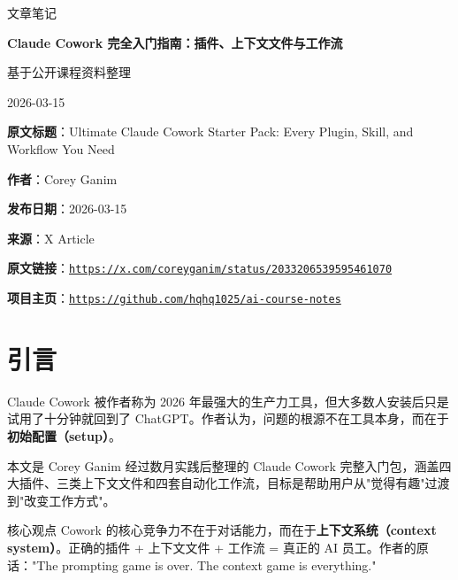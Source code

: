 \documentclass[a4paper]{article}
\newcommand{\notetitle}{Claude Cowork 完全入门指南：插件、上下文文件与工作流}
\newcommand{\noteauthors}{基于公开课程资料整理}
\newcommand{\notedate}{2026-03-15}
\newcommand{\articleauthor}{Corey Ganim}
\newcommand{\articlepublishdate}{2026-03-15}
\newcommand{\articleurl}{https://x.com/coreyganim/status/2033206539595461070}
\newcommand{\repourl}{https://github.com/hqhq1025/ai-course-notes}
\begin{document}
\begin{titlepage}
\centering
{\Large 文章笔记\par}
\vspace{1.2cm}
{\huge\bfseries \notetitle\par}
\vspace{0.8cm}
{\large \noteauthors\par}
\vspace{0.3cm}
{\large \notedate\par}
\vspace{2cm}

\vfill
\begin{tcolorbox}[width=0.9\textwidth, colback=black!2!white, colframe=black!60, sharp corners]
\textbf{原文标题}：Ultimate Claude Cowork Starter Pack: Every Plugin, Skill, and Workflow You Need\par
\textbf{作者}：\articleauthor\par
\textbf{发布日期}：\articlepublishdate\par
\textbf{来源}：X Article\par
\textbf{原文链接}：\href{\articleurl}{\nolinkurl{\articleurl}}\par
\textbf{项目主页}：\href{\repourl}{\nolinkurl{\repourl}}\par
\end{tcolorbox}
\end{titlepage}

\tableofcontents
\newpage


\section{引言}

Claude Cowork 被作者称为 2026 年最强大的生产力工具，但大多数人安装后只是试用了十分钟就回到了 ChatGPT。作者认为，问题的根源不在工具本身，而在于\textbf{初始配置（setup）}。

本文是 Corey Ganim 经过数月实践后整理的 Claude Cowork 完整入门包，涵盖四大插件、三类上下文文件和四套自动化工作流，目标是帮助用户从"觉得有趣"过渡到"改变工作方式"。

\begin{importantbox}{核心观点}
Cowork 的核心竞争力不在于对话能力，而在于\textbf{上下文系统（context system）}。正确的插件 + 上下文文件 + 工作流 = 真正的 AI 员工。作者的原话："The prompting game is over. The context game is everything."
\end{importantbox}
\end{document}

